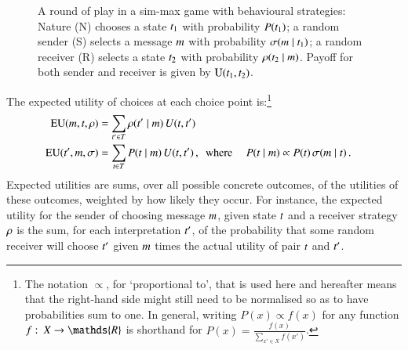 \documentclass[12pt,english]{article}
\newcommand{\similarity}{\ensuremath{\mathrm{Sim}}} %
\renewcommand{\Pr}{\ensuremath{P}}
\numberwithin{equation}{section}
\begin{document}
\begin{figure}
  \centering


  \caption{A round of play in a sim-max game with behavioural strategies: Nature (N) chooses a
    state $t_{\mathrm{1}}$ with probability $\Pr(\mystate{1})$; a random sender (S) selects a
    message $m$ with probability $\sigma(m \mid t_{\mathrm{1}})$; a random receiver
    (R) selects a state $t_{\mathrm{2}}$ with probability $\rho(t_{\mathrm{2}} \mid m)$.
    Payoff for both sender and receiver is given by $\mathrm{U}(t_{\mathrm{1}}, t_{\mathrm{2}})$.}
  \label{fig:sim-max-illustration}
\end{figure}

The expected utility of choices at each choice point is:\footnote{The notation
  $\propto$, for `proportional to', that is used here and hereafter means that the right-hand
  side might still need to be normalised so as to have probabilities sum to one. In general,
  writing $P(x) \propto f(x)$ for any function $f \mycolon X \rightarrow \mathds{R}$ is
  shorthand for $P(x) = \frac{f(x)}{\sum_{x' \in X} f(x')}$. }
\begin{align*}
  \EU(\messg, \state, \Rstrat) & = \sum_{\state' \in \States}
  \Rstrat(\state' \probbar \messg) \myts U(\state, \state') \\
  \EU(\state', \messg, \Sstrat) & = \sum_{\state \in
    \States} P(\state \probbar \messg)  \myts
  U(\state, \state')\,, \text{\ \  where } &
P(\state \probbar \messg) & \propto \Pr(\state) \myts \Sstrat(\messg \probbar \state) \,.
\end{align*}
Expected utilities are sums, over all possible concrete outcomes, of the utilities of these
outcomes, weighted by how likely they occur. For instance, the expected utility for the sender
of choosing message $m$, given state $t$ and a receiver strategy $\rho$ is the
sum, for each interpretation $t'$, of the probability that some random receiver will
choose $t'$ given $m$ times the actual utility of pair $t$ and
$t'$.
\end{document}
